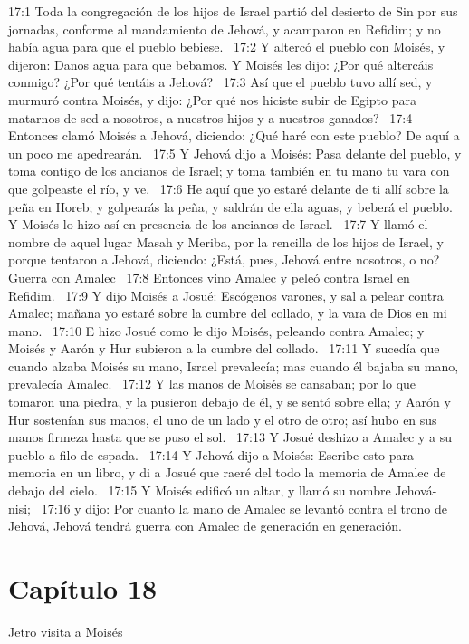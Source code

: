 17:1 Toda la congregación de los hijos de Israel partió del desierto de Sin por sus jornadas, conforme al mandamiento de Jehová, y acamparon en Refidim; y no había agua para que el pueblo bebiese.  
17:2 Y altercó el pueblo con Moisés, y dijeron: Danos agua para que bebamos. Y Moisés les dijo: ¿Por qué altercáis conmigo? ¿Por qué tentáis a Jehová?  
17:3 Así que el pueblo tuvo allí sed, y murmuró contra Moisés, y dijo: ¿Por qué nos hiciste subir de Egipto para matarnos de sed a nosotros, a nuestros hijos y a nuestros ganados?  
17:4 Entonces clamó Moisés a Jehová, diciendo: ¿Qué haré con este pueblo? De aquí a un poco me apedrearán.  
17:5 Y Jehová dijo a Moisés: Pasa delante del pueblo, y toma contigo de los ancianos de Israel; y toma también en tu mano tu vara con que golpeaste el río, y ve.  
17:6 He aquí que yo estaré delante de ti allí sobre la peña en Horeb; y golpearás la peña, y saldrán de ella aguas, y beberá el pueblo. Y Moisés lo hizo así en presencia de los ancianos de Israel.  
17:7 Y llamó el nombre de aquel lugar Masah y Meriba, por la rencilla de los hijos de Israel, y porque tentaron a Jehová, diciendo: ¿Está, pues, Jehová entre nosotros, o no?  
Guerra con Amalec  
17:8 Entonces vino Amalec y peleó contra Israel en Refidim.  
17:9 Y dijo Moisés a Josué: Escógenos varones, y sal a pelear contra Amalec; mañana yo estaré sobre la cumbre del collado, y la vara de Dios en mi mano.  
17:10 E hizo Josué como le dijo Moisés, peleando contra Amalec; y Moisés y Aarón y Hur subieron a la cumbre del collado.  
17:11 Y sucedía que cuando alzaba Moisés su mano, Israel prevalecía; mas cuando él bajaba su mano, prevalecía Amalec.  
17:12 Y las manos de Moisés se cansaban; por lo que tomaron una piedra, y la pusieron debajo de él, y se sentó sobre ella; y Aarón y Hur sostenían sus manos, el uno de un lado y el otro de otro; así hubo en sus manos firmeza hasta que se puso el sol.  
17:13 Y Josué deshizo a Amalec y a su pueblo a filo de espada.  
17:14 Y Jehová dijo a Moisés: Escribe esto para memoria en un libro, y di a Josué que raeré del todo la memoria de Amalec de debajo del cielo.  
17:15 Y Moisés edificó un altar, y llamó su nombre Jehová- nisi;  
17:16 y dijo: Por cuanto la mano de Amalec se levantó contra el trono de Jehová, Jehová tendrá guerra con Amalec de generación en generación.  
\section*{Capítulo 18 }
Jetro visita a Moisés 

